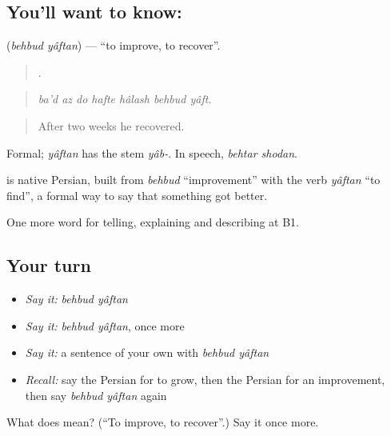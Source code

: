 \subsection*{You'll want to know:  }
\textbf{ } (\emph{behbud yâftan}) — \textquotedblleft{}to improve, to recover\textquotedblright{}.

\begin{quote}
      .
\end{quote}

\begin{quote}
\emph{ba'd az do hafte hâlash behbud yâft.}
\end{quote}

\begin{quote}
After two weeks he recovered.
\end{quote}

Formal; \emph{yâftan} has the stem \emph{yâb-}. In speech, \emph{behtar shodan}.

\begin{cousinweb}
\textbf{ } is native Persian, built from \emph{behbud} \textquotedblleft{}improvement\textquotedblright{} with the verb \emph{yâftan} \textquotedblleft{}to find\textquotedblright{}, a formal way to say that something got better.
\end{cousinweb}

\begin{grammarlens}[title={What you've built}]
One more word for telling, explaining and describing at B1.
\end{grammarlens}

\subsection*{Your turn}
\begin{itemize}
\raggedright
  \item \emph{Say it:} \emph{behbud yâftan}
  \item \emph{Say it:} \emph{behbud yâftan}, once more
  \item \emph{Say it:} a sentence of your own with \emph{behbud yâftan}
  \item \emph{Recall:} say the Persian for to grow, then the Persian for an improvement, then say \emph{behbud yâftan} again
\end{itemize}

\begin{tcolorbox}[breakable,colback=teal!4,colframe=teal!35!black,title={Before you move on}]
What does   mean? (\textquotedblleft{}To improve, to recover\textquotedblright{}.) Say it once more.
\end{tcolorbox}
